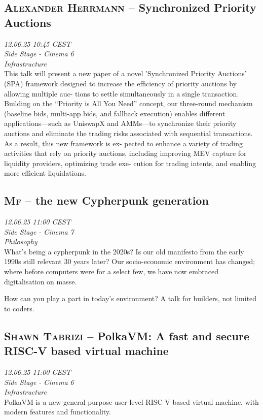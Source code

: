 \subsection {\textsc{Alexander Herrmann}  -- Synchronized Priority Auctions} \noindent \textit {12.06.25 10:45 CEST\\ Side Stage - Cinema 6\\ Infrastructure}\\[1em] This talk will present a new paper of a novel ’Synchronized Priority Auctions’ (SPA) framework
designed to increase the efficiency of priority auctions by allowing multiple auc-
tions to settle simultaneously in a single transaction. Building on the “Priority
is All You Need” concept, our three-round mechanism (baseline bids, multi-app
bids, and fallback execution) enables different applications—such as UniswapX
and AMMs—to synchronize their priority auctions and eliminate the trading risks
associated with sequential transactions. As a result, this new framework is ex-
pected to enhance a variety of trading activities that rely on priority auctions,
including improving MEV capture for liquidity providers, optimizing trade exe-
cution for trading intents, and enabling more efficient liquidations.

\clearpage
\subsection {\textsc{Mf}  -- the new Cypherpunk generation} \noindent \textit {12.06.25 11:00 CEST\\ Side Stage - Cinema 7\\ Philosophy}\\[1em] What's being a cypherpunk in the 2020s? Is our old manifesto from the early 1990s still relevant 30 years later? Our socio-economic environment has changed; where before computers were for a select few, we have now embraced digitalisation on masse.

How can you play a part in today's environment? A talk for builders, not limited to coders.

\clearpage
\subsection {\textsc{Shawn Tabrizi}  -- PolkaVM: A fast and secure RISC-V based virtual machine} \noindent \textit {12.06.25 11:00 CEST\\ Side Stage - Cinema 6\\ Infrastructure}\\[1em] PolkaVM is a new general purpose user-level RISC-V based virtual machine, with modern features and functionality.

